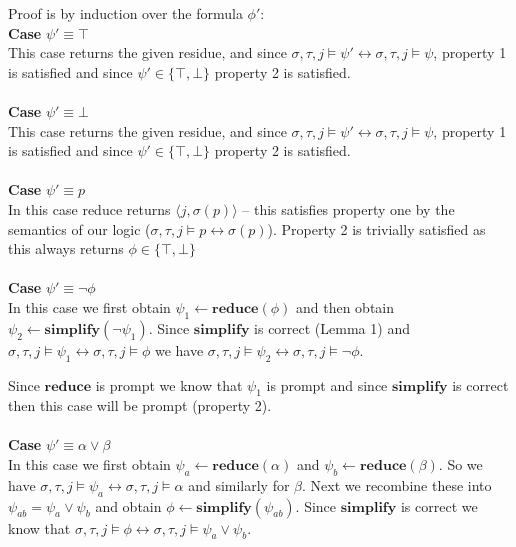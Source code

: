\documentclass[10pt,a4paper]{article}
\newcommand{\rp}[2]{\ensuremath{\langle #1, #2 \rangle}}
\begin{document}
\noindent Proof is by induction over the formula $\phi'$: \\
\noindent \textbf{Case} $\psi' \equiv \top$ \\
This case returns the given residue, and since $\sigma, \tau, j \vDash \psi' \leftrightarrow \sigma, \tau, j \vDash \psi$, 
property 1 is satisfied and since $\psi' \in \{\top,\bot\}$ property 2 is satisfied.
\\ \\ %
\noindent \textbf{Case} $\psi' \equiv \bot$ \\
This case returns the given residue, and since $\sigma, \tau, j \vDash \psi' \leftrightarrow \sigma, \tau, j \vDash \psi$, 
property 1 is satisfied and since $\psi' \in \{\top,\bot\}$ property 2 is satisfied.
\\ \\ %
\noindent \textbf{Case} $\psi' \equiv p$ \\
In this case reduce returns $\rp{j}{\sigma(p)}$ -- this satisfies property one by the semantics of our logic ($\sigma, \tau, j \vDash p \leftrightarrow \sigma(p)$).
Property 2 is trivially satisfied as this always returns $\phi \in \{\top, \bot\}$
\\ \\ %
\noindent \textbf{Case} $\psi' \equiv \neg \phi$ \\
In this case we first obtain $\psi_1 \leftarrow \mathbf{reduce}(\phi)$ and then obtain $\psi_2 \leftarrow \mathbf{simplify}(\neg \psi_1)$.
Since $\mathbf{simplify}$ is correct (Lemma 1) and $\sigma, \tau, j \vDash \psi_1 \leftrightarrow \sigma, \tau, j \vDash \phi$ 
	we have $\sigma, \tau, j \vDash \psi_2 \leftrightarrow \sigma, \tau, j \vDash \neg \phi$.

Since $\mathbf{reduce}$ is prompt we know that $\psi_1$ is prompt and since $\mathbf{simplify}$ is correct then this case will be prompt (property 2).
\\ \\ %
\noindent \textbf{Case} $\psi' \equiv \alpha \vee \beta$ \\
In this case we first obtain $\psi_a \leftarrow \mathbf{reduce}(\alpha)$ and $\psi_b \leftarrow \mathbf{reduce}(\beta)$.
So we have $\sigma, \tau, j \vDash \psi_a \leftrightarrow \sigma, \tau, j \vDash \alpha$ and similarly for $\beta$.
Next we recombine these into $\psi_{ab} = \psi_a \vee \psi_b$ and obtain $\phi \leftarrow \mathbf{simplify}(\psi_{ab})$.
Since $\mathbf{simplify}$ is correct we know that $\sigma, \tau, j \vDash \phi \leftrightarrow \sigma, \tau, j \vDash \psi_a \vee \psi_b$.
\end{document}
